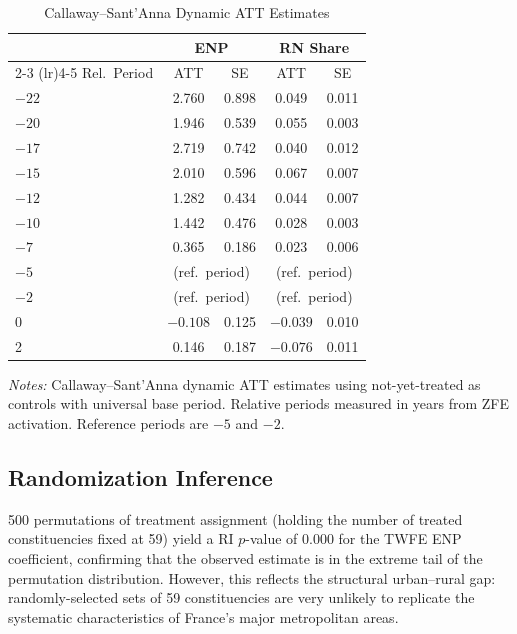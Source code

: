 \documentclass[12pt]{article}
\begin{document}
\begin{table}[H]
\centering
\caption{Callaway--Sant'Anna Dynamic ATT Estimates}
\label{tab:cs_dynamic}
\begin{threeparttable}
\begin{tabular}{lcccc}
\toprule
 & \multicolumn{2}{c}{ENP} & \multicolumn{2}{c}{RN Share} \\
\cmidrule(lr){2-3} \cmidrule(lr){4-5}
Rel.\ Period & ATT & SE & ATT & SE \\
\midrule
$-22$ & 2.760 & 0.898 & 0.049 & 0.011 \\
$-20$ & 1.946 & 0.539 & 0.055 & 0.003 \\
$-17$ & 2.719 & 0.742 & 0.040 & 0.012 \\
$-15$ & 2.010 & 0.596 & 0.067 & 0.007 \\
$-12$ & 1.282 & 0.434 & 0.044 & 0.007 \\
$-10$ & 1.442 & 0.476 & 0.028 & 0.003 \\
$-7$ & 0.365 & 0.186 & 0.023 & 0.006 \\
$-5$ & \multicolumn{2}{c}{(ref.\ period)} & \multicolumn{2}{c}{(ref.\ period)} \\
$-2$ & \multicolumn{2}{c}{(ref.\ period)} & \multicolumn{2}{c}{(ref.\ period)} \\
0 & $-0.108$ & 0.125 & $-0.039$ & 0.010 \\
2 & 0.146 & 0.187 & $-0.076$ & 0.011 \\
\bottomrule
\end{tabular}
\begin{tablenotes}[flushleft]
\small
\item \textit{Notes:} Callaway--Sant'Anna dynamic ATT estimates using not-yet-treated as controls with universal base period. Relative periods measured in years from ZFE activation. Reference periods are $-5$ and $-2$.
\end{tablenotes}
\end{threeparttable}
\end{table}

\subsection{Randomization Inference}

500 permutations of treatment assignment (holding the number of treated constituencies fixed at 59) yield a RI $p$-value of 0.000 for the TWFE ENP coefficient, confirming that the observed estimate is in the extreme tail of the permutation distribution. However, this reflects the structural urban--rural gap: randomly-selected sets of 59 constituencies are very unlikely to replicate the systematic characteristics of France's major metropolitan areas.
\end{document}
